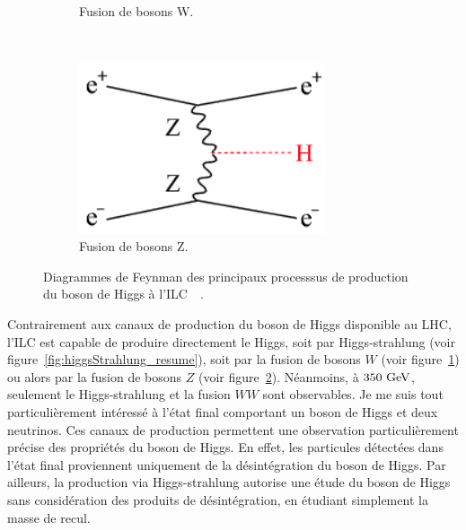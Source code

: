 \begin{figure}
\begin{subfigure}[t]{0.3\textwidth}
            \caption{Fusion de bosons W.}
            \label{fig:WW-fusion_resume}
        \end{subfigure}
        ~%
        \begin{subfigure}[t]{0.3\textwidth}
            \includegraphics[width = 0.8\textwidth]{Pictures/Higgs/HiggsProd_eeH.png}
            \caption{Fusion de bosons Z.}
            \label{fig:ZZ-fusion_resume}
        \end{subfigure}
        \caption{Diagrammes de Feynman des principaux processsus de production du boson de Higgs à l'ILC~\cite{Asner2013}~\cite{tian}.}
        \label{fig:higgsProduction_resume}
    \end{figure}    

  Contrairement aux canaux de production du boson de Higgs disponible au LHC, l'ILC est capable de produire directement le Higgs, soit par Higgs-strahlung (voir figure~\ref{fig:higgsStrahlung_resume}), soit par la fusion de bosons $W$ (voir figure~\ref{fig:WW-fusion_resume}) ou alors par la fusion de bosons $Z$ (voir figure~\ref{fig:ZZ-fusion_resume}).
  Néanmoins, à $350~\rm{GeV}$, seulement le Higgs-strahlung et la fusion $WW$ sont observables.
  Je me suis tout particulièrement intéressé à l'état final comportant un boson de Higgs et deux neutrinos.
  Ces canaux de production permettent une observation particulièrement précise des propriétés du boson de Higgs. 
  En effet, les particules détectées dans l'état final proviennent uniquement de la désintégration du boson de Higgs. 
  Par ailleurs, la production via Higgs-strahlung autorise une étude du boson de Higgs sans considération des produits de désintégration, en étudiant simplement la masse de recul.
  

